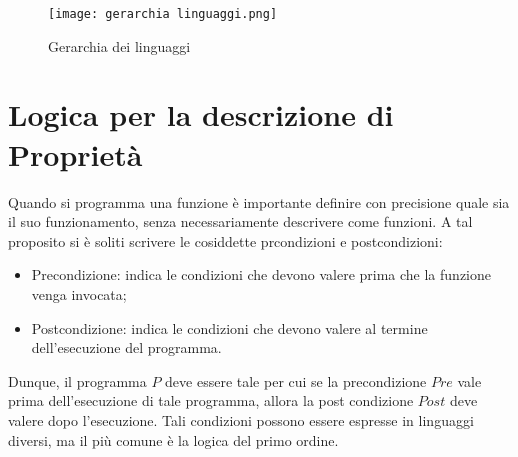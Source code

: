 \begin{figure}[!h]
  \centering
  \texttt{[image: gerarchia linguaggi.png]} 
  \caption{Gerarchia dei linguaggi}
\end{figure}

\break

\section{Logica per la descrizione di Proprietà}
Quando si programma una funzione è importante definire con precisione quale sia il suo funzionamento, senza necessariamente descrivere come funzioni. A tal proposito si è soliti scrivere le cosiddette prcondizioni e postcondizioni:
\begin{itemize}
  \item Precondizione: indica le condizioni che devono valere prima che la funzione venga invocata;
  \item Postcondizione: indica le condizioni che devono valere al termine dell'esecuzione del programma.  
\end{itemize}

Dunque, il programma \(P\) deve essere tale per cui se la precondizione \(Pre\) vale prima dell'esecuzione di tale programma, allora la post condizione \(Post\) deve valere dopo l'esecuzione. Tali condizioni possono essere espresse in linguaggi diversi, ma il più comune è la logica del primo ordine.